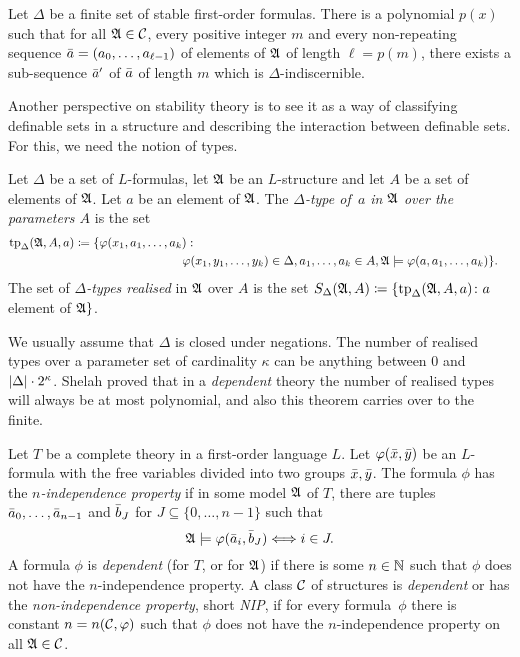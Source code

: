 \begin{theorem}\label{thm:malshelah}
  Let  $\Delta$ be a finite
  set of stable first-order formulas.  There is a polynomial $p(x)$ such that
  for all $\mathfrak{A}\in \mathcal{C}$, every positive integer $m$ and every non-repeating sequence
  $\bar{a}=(a_0,\ldots, a_{\ell-1})$ of elements of $\mathfrak{A}$ of length $\ell=p(m)$, there
  exists a sub-sequence $\bar{a}'$ of
  $\bar{a}$ of length $m$ which is
  $\Delta$-indiscernible.
\end{theorem}

Another perspective on stability theory is to see it as a way of 
classifying definable sets in a structure and describing the interaction 
between definable sets. For this, we need the notion of types. 

\begin{definition}
Let $\Delta$ be a set of $L$-formulas, let $\mathfrak{A}$ be an $L$-structure and let
$A$ be a set of elements of $\mathfrak{A}$. Let $a$ be an element of $\mathfrak{A}$. The 
\emph{$\Delta$-type of~$a$ in $\mathfrak{A}$ over the parameters $A$} is the set
\begin{align*}
  \mathrm{tp}_\Delta(\strA, A, a) & \coloneqq  \{ \phi(x_1,a_1,\ldots, a_k)  : &\\
  &  \hspace{3.1cm}
                                \phi(x_1,y_1,\ldots, y_k)\in \Delta,
                                a_1,\ldots, a_k\in A,
                                \strA\models\phi(a,a_1,\ldots, a_k)\}.
\end{align*}
The set of \emph{$\Delta$-types realised} in $\mathfrak{A}$ over $A$ is the set
$S_\Delta(\mathfrak{A},A) \coloneqq \{ \mathrm{tp}_\Delta(\mathfrak{A}, A, a) \colon a$ element of $\mathfrak{A}\}$.
\end{definition}

We usually assume that $\Delta$ is closed under negations. 
The number of realised types over a parameter set of cardinality
$\kappa$ can be anything between $0$ and $\left\lvert\Delta\right\rvert\cdot 2^\kappa$. 
Shelah proved that
in a \emph{dependent} theory the number of realised types will always be
at most polynomial, and also this theorem carries over to the finite. 

\begin{definition}
Let $T$ be a complete theory in a first-order language $L$. Let 
$\varphi(\bar{x},\bar{y})$ be an $L$-formula with the free variables
divided into two groups $\bar{x}, \bar{y}$. The formula $\phi$ has
the \emph{$n$-independence property} if in some model $\mathfrak{A}$
of $T$, there are tuples $\bar{a}_0,\ldots, \bar{a}_{n-1}$ and
$\bar{b}_J$ for $J\subseteq \{0,\ldots, n-1\}$ such that
\[\mathfrak{A}\models\varphi(\bar{a}_i,\bar{b}_J)\Longleftrightarrow i\in J. \]
A formula $\phi$ is \emph{dependent} (for $T$, or for $\mathfrak{A}$) if there is 
some $n\in \mathbb{N}$ such that $\phi$ does not have the $n$-independence property. 
A class $\mathcal{C}$ of structures is \emph{dependent} or has the \emph{non-independence property}, 
short \emph{NIP}, if for every formula~$\phi$ there is constant $n=n(\mathcal{C},\varphi)$
such that $\phi$ does not have the $n$-independence property on all $\mathfrak{A}\in \mathcal{C}$.
\end{definition}

